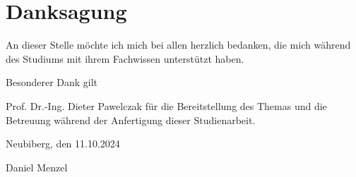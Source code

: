 
\chapter*{Danksagung}

\thispagestyle{empty} %
An dieser Stelle möchte ich mich bei allen herzlich bedanken,
die mich während des Studiums mit ihrem Fachwissen unterstützt haben.

Besonderer Dank gilt

Prof. Dr.-Ing. Dieter Pawelczak für die Bereitstellung des Themas und die Betreuung während der Anfertigung dieser Studienarbeit.

\vspace{1cm} %
Neubiberg, den 11.10.2024

\vspace{1cm} %
\noindent\makebox[2in]{\hrulefill} %

Daniel Menzel